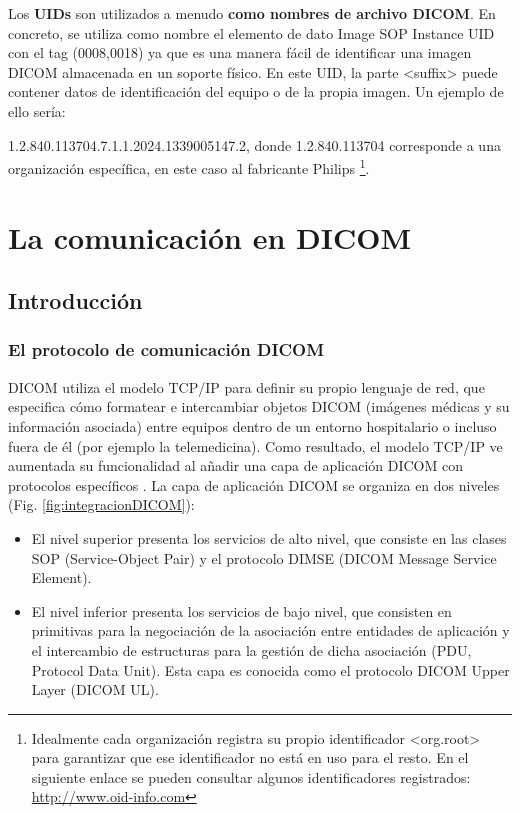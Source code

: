 Los \textbf{UIDs} son utilizados a menudo \textbf{como nombres de archivo DICOM}. En concreto, se utiliza como nombre el elemento de dato Image SOP Instance UID con el tag (0008,0018) ya que es una manera fácil de identificar una imagen DICOM almacenada en un soporte físico. En este UID, la parte <suffix> puede contener datos de identificación del equipo o de la propia imagen. Un ejemplo de ello sería:

1.2.840.113704.7.1.1.2024.1339005147.2, donde 1.2.840.113704 corresponde a una organización específica, en este caso al fabricante Philips \footnote{Idealmente cada organización registra su propio identificador <org.root> para garantizar que ese identificador no está en uso para el resto. En el siguiente enlace se pueden consultar algunos identificadores registrados: \url{http://www.oid-info.com}}.

\section{La comunicación en DICOM}
\subsection{Introducción}
\subsubsection{El protocolo de comunicación DICOM}
DICOM utiliza el modelo TCP/IP para definir su propio lenguaje de red, que especifica cómo formatear e intercambiar objetos DICOM (imágenes médicas y su información asociada) entre equipos dentro de un entorno hospitalario o incluso fuera de él (por ejemplo la telemedicina). Como resultado, el modelo TCP/IP ve aumentada su funcionalidad al añadir una capa de aplicación DICOM con protocolos específicos \cite{10} \cite{17}.
La capa de aplicación DICOM se organiza en dos niveles (Fig. \ref{fig:integracionDICOM}):
\begin{itemize}
\item El nivel superior presenta los servicios de alto nivel, que consiste en las clases SOP (Service-Object Pair) y el protocolo DIMSE (DICOM Message Service Element).
\item El nivel inferior presenta los servicios de bajo nivel, que consisten en primitivas para la negociación de la asociación entre entidades de aplicación y el intercambio de estructuras para la gestión de dicha asociación (PDU, Protocol Data Unit). Esta capa es conocida como el protocolo DICOM Upper Layer (DICOM UL).
\end{itemize}

